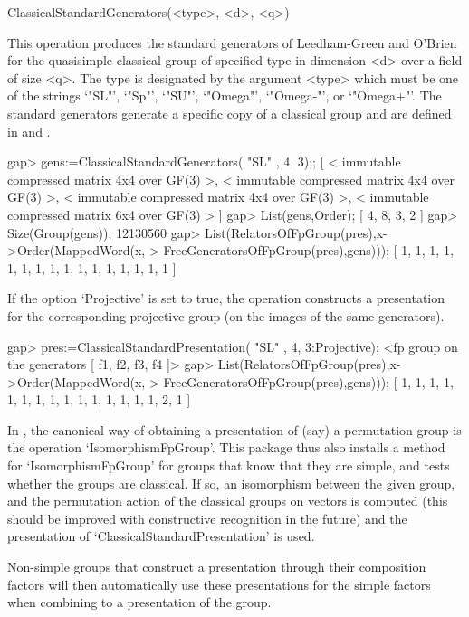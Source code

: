 \>ClassicalStandardGenerators(<type>, <d>, <q>)

This operation produces the standard generators of Leedham-Green and O'Brien
for the quasisimple classical group of specified type in dimension <d> over a
field of size <q>. The type is designated by the argument <type> which must be
one of the strings `"SL"', `"Sp"', `"SU"', `"Omega"', `"Omega-"', or
`"Omega+"'. The
standard generators generate a specific copy of a classical group and are
defined in \cite{LGO09} and \cite{DLLGO13}.

\beginexample
gap> gens:=ClassicalStandardGenerators( "SL" , 4, 3);;
[ < immutable compressed matrix 4x4 over GF(3) >,
  < immutable compressed matrix 4x4 over GF(3) >,
  < immutable compressed matrix 4x4 over GF(3) >,
  < immutable compressed matrix 6x4 over GF(3) > ]
gap> List(gens,Order);
[ 4, 8, 3, 2 ]
gap> Size(Group(gens));
12130560
gap> List(RelatorsOfFpGroup(pres),x->Order(MappedWord(x,
> FreeGeneratorsOfFpGroup(pres),gens)));
[ 1, 1, 1, 1, 1, 1, 1, 1, 1, 1, 1, 1, 1, 1, 1, 1 ]
\endexample

If the option `Projective' is set to true, the operation constructs a
presentation for the corresponding projective group (on the images of the
same generators).

\beginexample
gap> pres:=ClassicalStandardPresentation( "SL" , 4, 3:Projective);
<fp group on the generators [ f1, f2, f3, f4 ]>
gap> List(RelatorsOfFpGroup(pres),x->Order(MappedWord(x,
> FreeGeneratorsOfFpGroup(pres),gens)));
[ 1, 1, 1, 1, 1, 1, 1, 1, 1, 1, 1, 1, 1, 1, 1, 2, 1 ]
\endexample


In {\GAP}, the canonical way of obtaining a presentation of (say) a
permutation group is the operation `IsomorphismFpGroup'. This package thus
also installs a method for `IsomorphismFpGroup' for groups that know that
they are simple, and tests whether the groups are classical. If so, an
isomorphism between the given group, and the permutation action of the
classical groups on vectors is computed (this should be improved with
constructive recognition in the future) and the presentation of
`ClassicalStandardPresentation' is used.

Non-simple groups that construct a presentation through their composition
factors will then automatically use these presentations for the simple
factors when combining to a presentation of the group.

